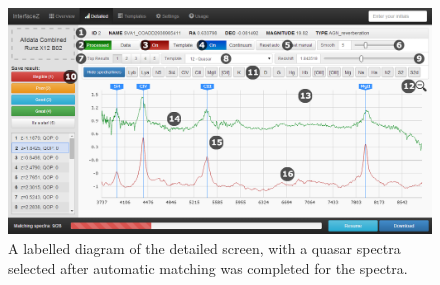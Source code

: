 \documentclass[titlesmallcaps, examinerscopy, copyrightpage]{uqthesis}
\begin{document}
\begin{figure}[ht!]
\includegraphics[width=1\textwidth]{images/detailed2.png} 
\centering
\caption{A labelled diagram of the detailed screen, with a quasar spectra selected after automatic matching was completed for the spectra.}
\label{fig:detailed}
\end{figure}
\end{document}
